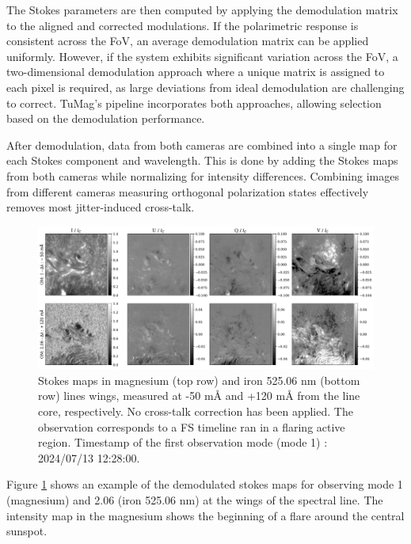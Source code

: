 The Stokes parameters are then computed by applying the demodulation matrix to the aligned and corrected modulations. If the polarimetric response is consistent across the FoV, an average demodulation matrix can be applied uniformly. However, if the system exhibits significant variation across the FoV, a two-dimensional demodulation approach where a unique matrix is assigned to each pixel is required, as large deviations from ideal demodulation are challenging to correct. TuMag's pipeline incorporates both approaches, allowing selection based on the demodulation performance. 

After demodulation, data from both cameras are combined into a single map for each Stokes component and wavelength. This is done by adding the Stokes maps from both cameras while normalizing for intensity differences. Combining images from different cameras measuring orthogonal polarization states effectively removes most jitter-induced cross-talk.

\begin{figure}
  \includegraphics[width=\textwidth]{figures/Pipeline/Example_demodulation.pdf}
  \caption[Stokes maps for magnesium and iron.]{Stokes maps in magnesium (top row) and iron 525.06 nm (bottom row) lines wings, measured at -50 m\r{A} and +120 m\r{A} from the line core, respectively. No cross-talk correction has been applied. The observation corresponds to a FS timeline ran in a flaring active region. Timestamp of the first observation mode (mode 1) : 2024/07/13 12:28:00.  }
    \label{fig_pipeline: demodulated_data}
\end{figure}

Figure \ref{fig_pipeline: demodulated_data} shows an example of the demodulated stokes maps for observing mode 1 (magnesium) and 2.06 (iron 525.06 nm) at the wings of the spectral line. The intensity map in the magnesium shows the beginning of a flare around the central sunspot. 

